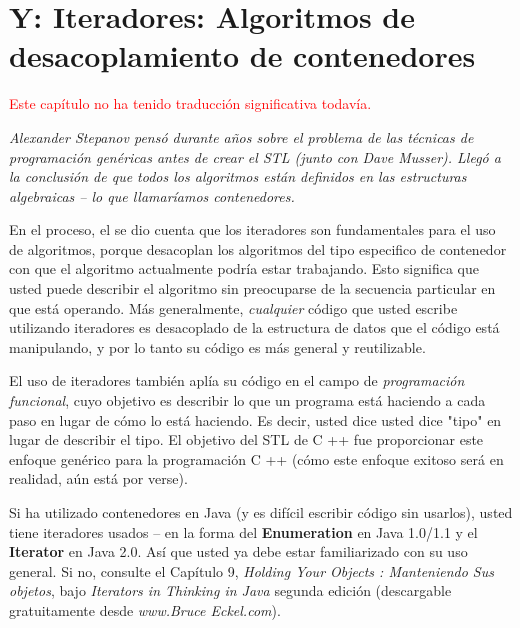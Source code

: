 \documentclass{article}
\begin{document}
\newpage

\section{\texorpdfstring{Y: Iteradores: \newline  Algoritmos de desacoplamiento de contenedores}{Y: Iteradores: Algoritmos de desacoplamiento de contenedores}}

\textcolor{red}{Este capítulo no ha tenido traducción significativa todavía.}    \newline%

\textit{Alexander Stepanov pensó durante años sobre el problema de las técnicas de programación genéricas antes de crear el STL (junto con Dave Musser). Llegó a la conclusión de que todos los algoritmos están definidos en las estructuras algebraicas – lo que llamaríamos contenedores.}

En el proceso, el se dio cuenta que los iteradores son fundamentales para el uso de algoritmos, porque desacoplan los algoritmos del tipo especifico de contenedor con que el algoritmo actualmente podría estar trabajando. Esto significa que usted puede describir el algoritmo sin preocuparse de la secuencia particular en que está operando. Más generalmente, \textit{cualquier} código que usted escribe utilizando iteradores es desacoplado de la estructura de datos que el código está manipulando, y por lo tanto su código es más general y reutilizable. \newline

El uso de iteradores también aplía su código en el campo de \textit{programación funcional}, cuyo objetivo es describir lo que un programa está haciendo a cada paso en lugar de cómo lo está haciendo. Es decir, usted dice usted dice "tipo" en lugar de
describir el tipo. El objetivo del STL de C ++ fue proporcionar este enfoque genérico para la programación C ++ (cómo este enfoque exitoso será en realidad, aún está por verse). \newline

Si ha utilizado contenedores en Java (y es difícil escribir código sin usarlos), usted tiene iteradores usados – en la forma del \textbf{Enumeration} en Java 1.0/1.1 y el \textbf{Iterator} en Java 2.0. Así que usted ya debe estar familiarizado con su uso general. Si no, consulte el Capítulo 9, \textit{Holding Your Objects : Manteniendo Sus objetos}, bajo \textit{Iterators in Thinking in Java} segunda edición (descargable gratuitamente desde \textit{www.Bruce Eckel.com}). \newline
\end{document}
